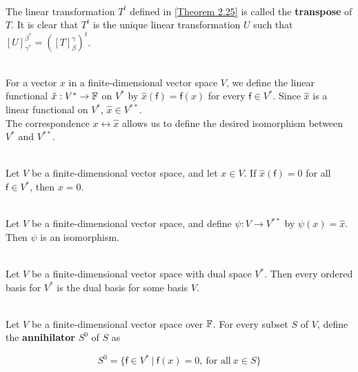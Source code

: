 \begin{definition}
	\hfill\\
	The linear transformation $T^t$ defined in \autoref{Theorem 2.25} is called the \textbf{transpose} of $T$. It is clear that $T^t$ is the unique linear transformation $U$ such that $[U]_{\gamma^*}^{\beta^*} = ([T]_\beta^\gamma)^t$.
\end{definition}

\begin{definition}
	\hfill\\
	For a vector $x$ in a finite-dimensional vector space $V$, we define the linear functional $\hat{x}: V^* \to \mathbb{F}$ on $V^*$ by $\hat{x}(\mathsf{f}) = \mathsf{f}(x)$ for every $\mathsf{f} \in V^*$. Since $\hat{x}$ is a linear functional on $V^*$, $\hat{x} \in V^{**}$.\\
	
	The correspondence $x \leftrightarrow \hat{x}$ allows us to define the desired isomorphism between $V^*$ and $V^{**}$.
\end{definition}

\begin{lemma}
	\hfill\\
	Let $V$ be a finite-dimensional vector space, and let $x \in V$. If $\hat{x}(\mathsf{f})=0$ for all $\mathsf{f} \in V^*$, then $x = 0$.
\end{lemma}

\begin{theorem}\label{Theorem 2.26}
	\hfill\\
	Let $V$ be a finite-dimensional vector space, and define $\psi: V \to V^{**}$ by $\psi(x) = \hat{x}$. Then $\psi$ is an isomorphism.
\end{theorem}

\begin{corollary}
	\hfill\\
	Let $V$ be a finite-dimensional vector space with dual space $V^*$. Then every ordered basis for $V^*$ is the dual basis for some basis $V$.
\end{corollary}

\begin{definition}
	\hfill\\
	Let $V$ be a finite-dimensional vector space over $\mathbb{F}$. For every subset $S$ of $V$, define the \textbf{annihilator} $S^0$ of $S$ as
	
	\[S^0 = \{\mathsf{f} \in V^*\ |\ \mathsf{f}(x) = 0,\ \text{for all}\ x \in S\}\]
\end{definition}